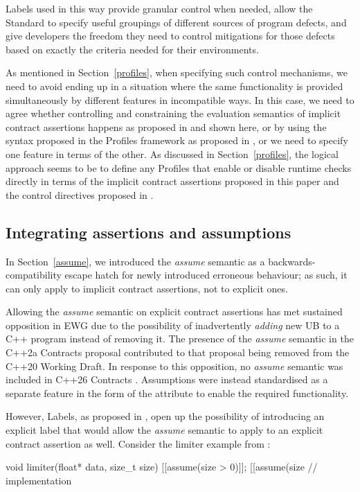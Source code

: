 Labels used in this way provide granular control when needed, allow the Standard to
specify useful groupings of different sources of program defects, and give developers the freedom they
need to control mitigations for those defects based on exactly the criteria needed for their environments.

As mentioned in Section~\ref{profiles}, when specifying such control mechanisms, we need to avoid ending up in a situation where the same functionality is provided simultaneously by different features in incompatible ways. In this case, we need to agree whether controlling and constraining the evaluation semantics of implicit contract assertions happens as proposed in  \cite{P3400R1} and shown here, or by using the syntax proposed in the Profiles framework as proposed in \cite{P3589R2}, or we need to specify one feature in terms of the other. As discussed in Section~\ref{profiles}, the logical approach seems to be to define any Profiles that enable or disable runtime checks directly in terms of the implicit contract assertions proposed in this paper and the control directives proposed in \cite{P3400R1}.

\subsection{Integrating assertions and assumptions}
\label{assumefuture}

In Section~\ref{assume}, we introduced the \emph{assume} semantic as a backwards-compatibility escape hatch for newly introduced erroneous behaviour; as such, it can only apply to implicit contract assertions, not to explicit ones.

Allowing the \emph{assume} semantic on explicit contract assertions has met sustained opposition in EWG due to the possibility of inadvertently \emph{adding} new UB to a C++ program instead of removing it. The presence of the \emph{assume} semantic in the C++2a Contracts proposal \cite{P0542R5} contributed to that proposal being removed from the C++20 Working Draft. In response to this opposition, no \emph{assume} semantic was included in C++26 Contracts \cite{P2900R14}. Assumptions were instead standardised as a separate feature in the form of the \tcode{[[assume]]} attribute \cite{P1774R8} to enable the required functionality.

However, Labels, as proposed in \cite{P3400R1}, open up the possibility of introducing an explicit label that would allow the \emph{assume} semantic to apply to an explicit contract assertion as well. Consider the limiter example from \cite{P1774R8}:
\begin{codeblock}
void limiter(float* data, size_t size) {
  [[assume(size > 0)]];
  [[assume(size %
  // implementation
}
\end{codeblock}


